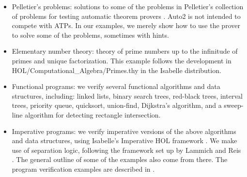 \documentclass[11pt,a4paper]{article}
\begin{document}
\begin{itemize}
\item Pelletier's problems: solutions to some of the problems in
  Pelletier's collection of problems for testing automatic theorem
  provers \cite{pelletier}. Auto2 is not intended to compete with
  ATPs. In our examples, we merely show how to use the prover to solve
  some of the problems, sometimes with hints.

\item Elementary number theory: theory of prime numbers up to the
  infinitude of primes and unique factorization. This example follows
  the development in HOL/Computational\_Algebra/Primes.thy in the
  Isabelle distribution.

\item Functional programs: we verify several functional algorithms and
  data structures, including: linked lists, binary search trees,
  red-black trees, interval trees, priority queue, quicksort,
  union-find, Dijkstra's algorithm, and a sweep-line algorithm for
  detecting rectangle intersection.

\item Imperative programs: we verify imperative versions of the above
  algorithms and data structures, using Isabelle's Imperative HOL
  framework \cite{imphol}. We make use of separation logic, following
  the framework set up by Lammich and Reis \cite{seplogic-afp}. The
  general outline of some of the examples also come from there. The
  program verification examples are described in \cite{zhan18a}.
\end{itemize}





\end{document}

